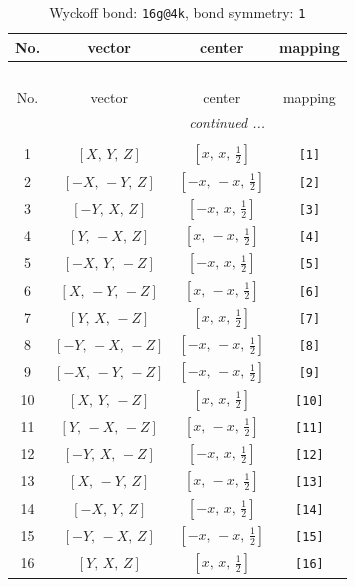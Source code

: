 \documentclass[fleqn,8pt]{jsarticle}
\begin{document}
\begin{longtable}{cccc}
\caption{Wyckoff bond: {\tt 16g@4k}, bond symmetry: {\tt 1}}
 \\
 \hline \hline
No. & vector & center & mapping \\ \hline \endfirsthead

\multicolumn{3}{l}{\tablename\ \thetable{}} \\
 \hline \hline
No. & vector & center & mapping \\ \hline \endhead

 \hline \hline
\multicolumn{3}{r}{\footnotesize\it continued ...} \\ \endfoot

 \hline \hline
\multicolumn{3}{r}{} \\ \endlastfoot

1 & $\left[ X,\, Y,\, Z \right]$ & $\left[ x,\, x,\, \frac{1}{2} \right]$ & {\tt [1]} \\ \hline
2 & $\left[ - X,\, - Y,\, Z \right]$ & $\left[ - x,\, - x,\, \frac{1}{2} \right]$ & {\tt [2]} \\ \hline
3 & $\left[ - Y,\, X,\, Z \right]$ & $\left[ - x,\, x,\, \frac{1}{2} \right]$ & {\tt [3]} \\ \hline
4 & $\left[ Y,\, - X,\, Z \right]$ & $\left[ x,\, - x,\, \frac{1}{2} \right]$ & {\tt [4]} \\ \hline
5 & $\left[ - X,\, Y,\, - Z \right]$ & $\left[ - x,\, x,\, \frac{1}{2} \right]$ & {\tt [5]} \\ \hline
6 & $\left[ X,\, - Y,\, - Z \right]$ & $\left[ x,\, - x,\, \frac{1}{2} \right]$ & {\tt [6]} \\ \hline
7 & $\left[ Y,\, X,\, - Z \right]$ & $\left[ x,\, x,\, \frac{1}{2} \right]$ & {\tt [7]} \\ \hline
8 & $\left[ - Y,\, - X,\, - Z \right]$ & $\left[ - x,\, - x,\, \frac{1}{2} \right]$ & {\tt [8]} \\ \hline
9 & $\left[ - X,\, - Y,\, - Z \right]$ & $\left[ - x,\, - x,\, \frac{1}{2} \right]$ & {\tt [9]} \\ \hline
10 & $\left[ X,\, Y,\, - Z \right]$ & $\left[ x,\, x,\, \frac{1}{2} \right]$ & {\tt [10]} \\ \hline
11 & $\left[ Y,\, - X,\, - Z \right]$ & $\left[ x,\, - x,\, \frac{1}{2} \right]$ & {\tt [11]} \\ \hline
12 & $\left[ - Y,\, X,\, - Z \right]$ & $\left[ - x,\, x,\, \frac{1}{2} \right]$ & {\tt [12]} \\ \hline
13 & $\left[ X,\, - Y,\, Z \right]$ & $\left[ x,\, - x,\, \frac{1}{2} \right]$ & {\tt [13]} \\ \hline
14 & $\left[ - X,\, Y,\, Z \right]$ & $\left[ - x,\, x,\, \frac{1}{2} \right]$ & {\tt [14]} \\ \hline
15 & $\left[ - Y,\, - X,\, Z \right]$ & $\left[ - x,\, - x,\, \frac{1}{2} \right]$ & {\tt [15]} \\ \hline
16 & $\left[ Y,\, X,\, Z \right]$ & $\left[ x,\, x,\, \frac{1}{2} \right]$ & {\tt [16]} \\
\end{longtable}
\end{document}

